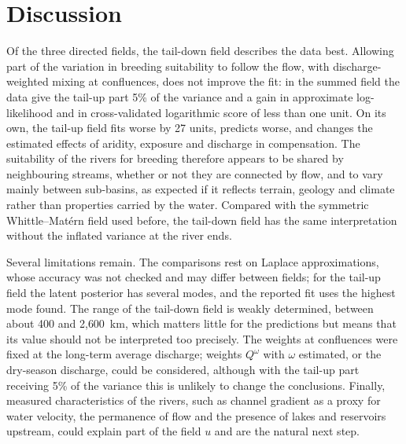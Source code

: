 \documentclass[11pt,a4paper]{article}
\begin{document}
\section{Discussion}

Of the three directed fields, the tail-down field describes the data best. Allowing part of the variation in breeding suitability to follow the flow, with discharge-weighted mixing at confluences, does not improve the fit: in the summed field the data give the tail-up part 5\% of the variance and a gain in approximate log-likelihood and in cross-validated logarithmic score of less than one unit. On its own, the tail-up field fits worse by 27 units, predicts worse, and changes the estimated effects of aridity, exposure and discharge in compensation. The suitability of the rivers for breeding therefore appears to be shared by neighbouring streams, whether or not they are connected by flow, and to vary mainly between sub-basins, as expected if it reflects terrain, geology and climate rather than properties carried by the water. Compared with the symmetric Whittle--Mat\'ern field used before, the tail-down field has the same interpretation without the inflated variance at the river ends.

Several limitations remain. The comparisons rest on Laplace approximations, whose accuracy was not checked and may differ between fields; for the tail-up field the latent posterior has several modes, and the reported fit uses the highest mode found. The range of the tail-down field is weakly determined, between about 400 and 2{,}600~km, which matters little for the predictions but means that its value should not be interpreted too precisely. The weights at confluences were fixed at the long-term average discharge; weights $Q^\omega$ with $\omega$ estimated, or the dry-season discharge, could be considered, although with the tail-up part receiving 5\% of the variance this is unlikely to change the conclusions. Finally, measured characteristics of the rivers, such as channel gradient as a proxy for water velocity, the permanence of flow and the presence of lakes and reservoirs upstream, could explain part of the field $u$ and are the natural next step.
\end{document}
